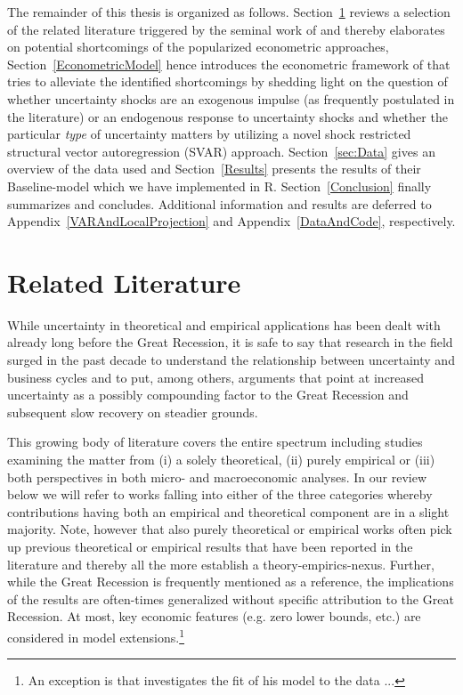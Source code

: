 \documentclass[a4paper,11pt,listof=nochaptergap,oneside,pointednumbers,bibtotoc,bigheadings,liststotoc]{scrbook}
\theoremstyle{mysatz}
\theoremstyle{mydefinition}
\theoremstyle{mytheorem}
\theoremstyle{mybemerkung}
\begin{document}
The remainder of this thesis is organized as follows. Section~\ref{UncertaintyandBusinessCyclesRelatedLiterature} reviews a selection of the related literature triggered by the seminal work of \citet{bloom:09} and thereby elaborates on potential shortcomings of the popularized econometric approaches, Section~\ref{EconometricModel} hence introduces the econometric framework of \citet{ludvigsonetal:18} that tries to alleviate the identified shortcomings by shedding light on the question of whether uncertainty shocks are an exogenous impulse (as frequently postulated in the literature) or an endogenous response to uncertainty shocks and whether the particular \textit{type} of uncertainty matters by utilizing a novel shock restricted structural vector autoregression (SVAR) approach. Section~\ref{sec:Data} gives an overview of the data used and Section~\ref{Results} presents the results of their Baseline-model which we have implemented in R. Section~\ref{Conclusion} finally summarizes and concludes. Additional information and results are deferred to Appendix~\ref{VARAndLocalProjection} and Appendix~\ref{DataAndCode}, respectively.



\chapter{Related Literature}
\label{UncertaintyandBusinessCyclesRelatedLiterature}

While uncertainty in theoretical and empirical applications has been dealt with already long before the Great Recession, it is safe to say that research in the field surged in the past decade to understand the relationship between uncertainty and business cycles and to put, among others, arguments that point at increased uncertainty as a possibly compounding factor to the Great Recession and subsequent slow recovery on steadier grounds. 

This growing body of literature covers the entire spectrum including studies examining the matter from (i) a solely theoretical, (ii) purely empirical or (iii) both perspectives in both micro- and macroeconomic analyses. In our review below we will refer to works falling into either of the three categories whereby contributions having both an empirical and theoretical component are in a slight majority.  Note, however that also purely theoretical or empirical works often pick up previous theoretical or empirical results that have been reported in the literature and thereby all the more establish a theory-empirics-nexus. Further, while the Great Recession is frequently mentioned as a reference, the implications of the results are often-times generalized without specific attribution to the Great Recession. At most, key economic features (e.g. zero lower bounds, etc.) are considered in model extensions.\footnote{An exception is \citet{schaal:17} that investigates the fit of his model to the data  ...} 
\end{document}
